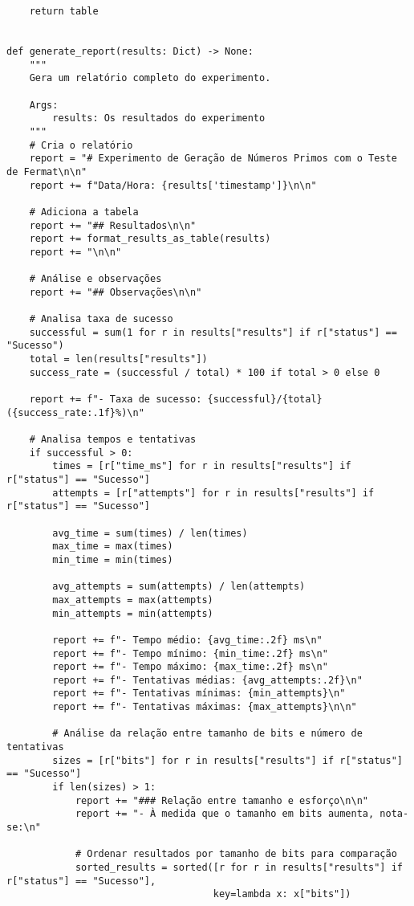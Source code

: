 \begin{verbatim}
    return table


def generate_report(results: Dict) -> None:
    """
    Gera um relatório completo do experimento.
    
    Args:
        results: Os resultados do experimento
    """
    # Cria o relatório
    report = "# Experimento de Geração de Números Primos com o Teste de Fermat\n\n"
    report += f"Data/Hora: {results['timestamp']}\n\n"
    
    # Adiciona a tabela
    report += "## Resultados\n\n"
    report += format_results_as_table(results)
    report += "\n\n"
    
    # Análise e observações
    report += "## Observações\n\n"
    
    # Analisa taxa de sucesso
    successful = sum(1 for r in results["results"] if r["status"] == "Sucesso")
    total = len(results["results"])
    success_rate = (successful / total) * 100 if total > 0 else 0
    
    report += f"- Taxa de sucesso: {successful}/{total} ({success_rate:.1f}%)\n"
    
    # Analisa tempos e tentativas
    if successful > 0:
        times = [r["time_ms"] for r in results["results"] if r["status"] == "Sucesso"]
        attempts = [r["attempts"] for r in results["results"] if r["status"] == "Sucesso"]
        
        avg_time = sum(times) / len(times)
        max_time = max(times)
        min_time = min(times)
        
        avg_attempts = sum(attempts) / len(attempts)
        max_attempts = max(attempts)
        min_attempts = min(attempts)
        
        report += f"- Tempo médio: {avg_time:.2f} ms\n"
        report += f"- Tempo mínimo: {min_time:.2f} ms\n"
        report += f"- Tempo máximo: {max_time:.2f} ms\n"
        report += f"- Tentativas médias: {avg_attempts:.2f}\n"
        report += f"- Tentativas mínimas: {min_attempts}\n"
        report += f"- Tentativas máximas: {max_attempts}\n\n"
        
        # Análise da relação entre tamanho de bits e número de tentativas
        sizes = [r["bits"] for r in results["results"] if r["status"] == "Sucesso"]
        if len(sizes) > 1:
            report += "### Relação entre tamanho e esforço\n\n"
            report += "- À medida que o tamanho em bits aumenta, nota-se:\n"
            
            # Ordenar resultados por tamanho de bits para comparação
            sorted_results = sorted([r for r in results["results"] if r["status"] == "Sucesso"], 
                                    key=lambda x: x["bits"])
            

\end{verbatim}
